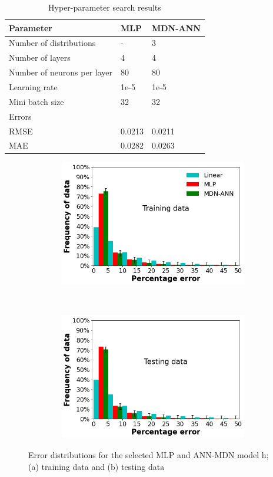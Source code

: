 \documentclass[a4paper,fleqn]{cas-dc}
\begin{document}
\begin{table}[h!]
\caption{Hyper-parameter search results}\label{tbl_hyper_results}
\begin{tabular*}{\tblwidth}{lp{}l}
\toprule
 Parameter& MLP & MDN-ANN \\ %
\midrule
 Number of distributions & - & 3  \\
 Number of layers & 4 & 4\\
 Number of neurons per layer & 80  & 80\\
 Learning rate & 1e-5 &  1e-5   \\
 Mini batch size  &32 & 32  \\
\midrule
Errors & &\\
\midrule
RMSE & 0.0213 & 0.0211\\
MAE & 0.0282& 0.0263\\
\bottomrule
\end{tabular*}
\end{table}  

\begin{figure}[h!]
\centering
    \begin{subfigure}{0.5\textwidth}
    \includegraphics[width=1\textwidth, height =5.5cm]{OVERALL_TRAIN}
    \caption{}
    \end{subfigure}\\
    \begin{subfigure}{0.5\textwidth}
    \includegraphics[width=1\textwidth, height =5.5cm]{OVERALL_TEST}
    \caption{}
    \end{subfigure}
    \caption{Error distributions for the selected MLP and ANN-MDN model h; (a) training data and (b) testing data}\label{fig_frequency_data}
\end{figure}
\end{document}
